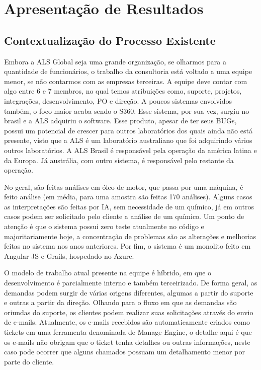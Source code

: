 \documentclass[12pt,a4paper]{report}
\begin{document}
    

\chapter{Apresentação de Resultados}

\section{Contextualização do Processo Existente}

Embora a ALS Global seja uma grande organização, se olharmos para a quantidade de funcionários, o trabalho da consultoria está voltado a uma equipe menor, se não contarmos com as empresas terceiras. A equipe deve contar com algo entre 6 e 7 membros, no qual temos atribuições como, suporte, projetos, integrações, desenvolvimento, PO e direção. A poucos sistemas envolvidos também, o foco maior acaba sendo o S360. Esse sistema, por sua vez, surgiu no brasil e a ALS adquiriu o software. Esse produto, apesar de ter seus BUGs, possui um potencial de crescer para outros laboratórios dos quais ainda não está presente, visto que a ALS é um laboratório australiano que foi adquirindo vários outros laboratórios. A ALS Brasil é responsável pela operação da américa latina e da Europa. Já austrália, com outro sistema, é responsável pelo restante da operação. 

No geral, são feitas análises em óleo de motor, que passa por uma máquina, é feito análise (em média, para uma amostra são feitas 170 análises). Alguns casos as interpretações são feitas por IA, sem necessidade de um químico, já em outros casos podem ser solicitado pelo cliente a análise de um químico. Um ponto de atenção é que o sistema possui zero teste atualmente no código e majoritariamente hoje, a concentração de problemas são as alterações e melhorias feitas no sistema nos anos anteriores. Por fim, o sistema é um monolito feito em Angular JS e Grails, hospedado no Azure.

O modelo de trabalho atual presente na equipe é híbrido, em que o desenvolvimento é parcialmente interno e também terceirizado. De forma geral, as demandas podem surgir de várias origens diferentes, algumas a partir do suporte e outras a partir da direção. Olhando para o fluxo em que as demandas são oriundas do suporte, os clientes podem realizar suas solicitações através do envio de e-mails. Atualmente, os e-mails recebidos são automaticamente criados como tickets em uma ferramenta denominada de Manage Engine, o detalhe aqui é que os e-mails não obrigam que o ticket tenha detalhes ou outras informações, neste caso pode ocorrer que alguns chamados possuam um detalhamento menor por parte do cliente. 
\end{document}
